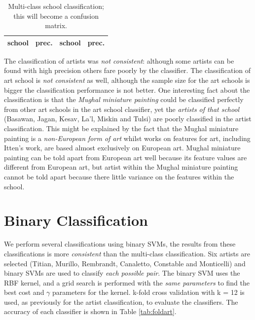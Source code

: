 \documentclass[11pt,a4paper,twoside,openright]{report}
\begin{document}
\begin{table}[ptb]
\centering
\begin{tabular}{|l|r||l|r|}
\toprule
school & prec. & school & prec. \\
\midrule

\bottomrule
\end{tabular}
\caption[Multi-class school classification]{Multi-class school classification;
this will become a confusion matrix.}
\label{tab:predsch}
\end{table}

The classification of artists was \emph{not consistent}: although some artists
can be found with high precision others fare poorly by the classifier.  The
classification of art school is \emph{not consistent} as well, although the
sample size for the art schools is bigger the classification performance is not
better.  One interesting fact about the classification is that the \emph{Mughal
miniature painting} could be classified perfectly from other art schools in the
art school classifier, yet the \emph{artists of that school} (Basawan, Jagan,
Kesav, La'l, Miskin and Tulsi) are poorly classified in the artist
classification.  This might be explained by the fact that the Mughal miniature
painting is a \emph{non-European form of art} whilst works on features for art,
including Itten's work, are based almost exclusively on European art.  Mughal
miniature painting can be told apart from European art well because its feature
values are different from European art, but artist within the Mughal miniature
painting cannot be told apart because there little variance on the features
within the school.

\section{Binary Classification}

We perform several classifications using binary SVMs, the results from these
classifications is more \emph{consistent} than the multi-class classification.
Six artists are selected (Titian, Murillo, Rembrandt, Canaletto, Constable and
Monticelli) and binary SVMs are used to classify \emph{each possible pair}.
The binary SVM uses the RBF kernel, and a grid search is performed with the
\emph{same parameters} to find the best cost and $\gamma$ parameters for the
kernel.  k-fold cross validation with k = 12 is used, as previously for the
artist classification, to evaluate the classifiers.  The accuracy of each
classifier is shown in Table \ref{tab:foldart}.
\end{document}
